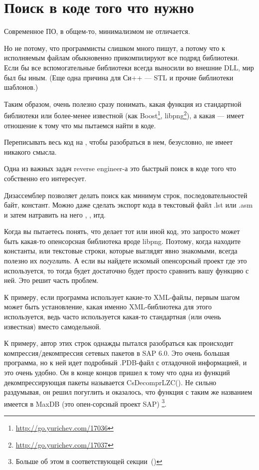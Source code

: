 \chapter{Поиск в коде того что нужно}

Современное ПО, в общем-то, минимализмом не отличается.

Но не потому, что программисты слишком много пишут, 
а потому что к исполняемым файлам обыкновенно прикомпилируют все подряд библиотеки. 
Если бы все вспомогательные библиотеки всегда выносили во внешние DLL, мир был бы иным.
(Еще одна причина для Си++ --- \ac{STL} и прочие библиотеки шаблонов.)

\newcommand{\FOOTNOTEBOOST}{\footnote{\url{http://go.yurichev.com/17036}}}
\newcommand{\FOOTNOTELIBPNG}{\footnote{\url{http://go.yurichev.com/17037}}}

Таким образом, очень полезно сразу понимать, какая функция из стандартной библиотеки или 
более-менее известной (как Boost\FOOTNOTEBOOST, libpng\FOOTNOTELIBPNG), 
а какая --- имеет отношение к тому что мы пытаемся найти в коде.

Переписывать весь код на \CCpp, чтобы разобраться в нем, безусловно, не имеет никакого смысла.

Одна из важных задач reverse engineer-а это быстрый поиск в коде того что собственно его интересует.

\myindex{\GrepUsage}
Дизассемблер \IDA позволяет делать поиск как минимум строк, последовательностей байт, констант.
Можно даже сделать экспорт кода в текстовый файл .lst или .asm и затем натравить на него , , итд.

Когда вы пытаетесь понять, что делает тот или иной код, это запросто может быть какая-то 
опенсорсная библиотека вроде libpng. Поэтому, когда находите константы, или текстовые строки, которые 
выглядят явно знакомыми, всегда полезно их \emph{погуглить}.
А если вы найдете искомый опенсорсный проект где это используется, 
то тогда будет достаточно будет просто сравнить вашу функцию с ней. 
Это решит часть проблем.

К примеру, если программа использует какие-то XML-файлы, первым шагом может быть
установление, какая именно XML-библиотека для этого используется, ведь часто используется какая-то
стандартная (или очень известная) вместо самодельной.

К примеру, автор этих строк однажды пытался разобраться как происходит компрессия/декомпрессия сетевых пакетов в SAP 6.0. 
Это очень большая программа, но к ней идет подробный .\gls{PDB}-файл с отладочной информацией, и это очень удобно. 
Он в конце концов пришел к тому что одна из функций декомпрессирующая пакеты называется CsDecomprLZC(). 
Не сильно раздумывая, он решил погуглить и оказалось, что функция с таким же названием имеется в MaxDB
(это опен-сорсный проект SAP) \footnote{Больше об этом в соответствующей секции~()}.

